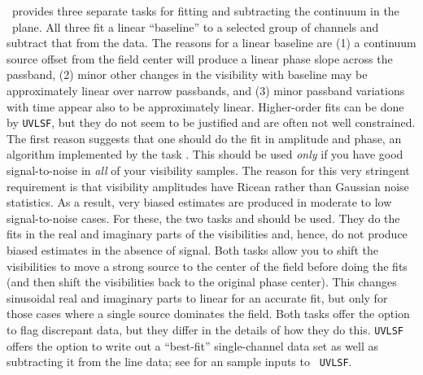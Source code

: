      \AIPS\ provides three separate tasks for fitting and subtracting
the continuum in the \uv\ plane.  All three fit a linear ``baseline''
to a selected group of channels and subtract that from the data.  The
reasons for a linear baseline are (1) a continuum source offset from
the field center will produce a linear phase slope across the
passband, (2) minor other changes in the visibility with baseline may
be approximately linear over narrow passbands, and (3) minor passband
variations with time appear also to be approximately linear.
Higher-order fits can be done by {\tt UVLSF}, but they do not seem to
be justified and are often not well constrained.  The first reason
suggests that one should do the fit in amplitude and phase, an
algorithm implemented by the task {\tt {}}\@.  This should
be used {\it only\/} if you have good signal-to-noise in {\it all\/}
of your visibility samples.  The reason for this very stringent
requirement is that visibility amplitudes have Ricean rather than
Gaussian noise statistics.  As a result, very biased estimates are
produced in moderate to low signal-to-noise cases.  For these, the two
tasks {\tt {}} and {\tt {}} should be used.  They
do the fits in the real and imaginary parts of the visibilities and,
hence, do not produce biased estimates in the absence of signal.  Both
tasks allow you to shift the visibilities to move a strong source to
the center of the field before doing the fits (and then shift the
visibilities back to the original phase center). This changes
sinusoidal real and imaginary parts to linear for an accurate fit, but
only for those cases where a single source dominates the field.  Both
tasks offer the option to flag discrepant data, but they differ in the
details of how they do this. {\tt UVLSF} offers the option to write
out a ``best-fit'' single-channel data set as well as subtracting it
from the line data; see  for an sample inputs to {\tt
UVLSF}\@.

